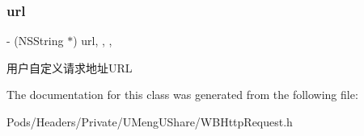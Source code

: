 \subsubsection{\texorpdfstring{url}{url}}
{\footnotesize\ttfamily -\/ (N\+S\+String $\ast$) url\hspace{0.3cm}{\ttfamily [read]}, {\ttfamily [write]}, {\ttfamily [nonatomic]}, {\ttfamily [strong]}}

用户自定义请求地址\+U\+RL 

The documentation for this class was generated from the following file\+:\begin{DoxyCompactItemize}
\item 
Pods/\+Headers/\+Private/\+U\+Meng\+U\+Share/W\+B\+Http\+Request.\+h\end{DoxyCompactItemize}
